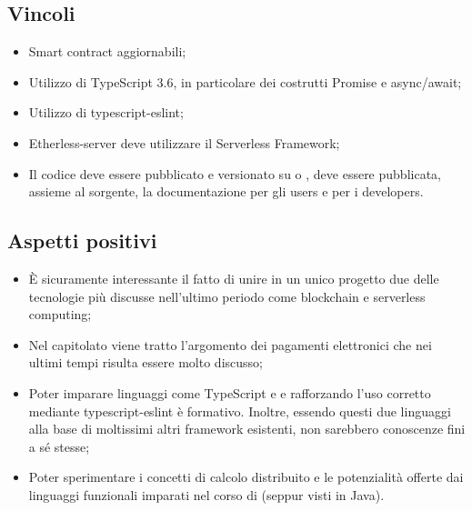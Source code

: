 \subsection{Vincoli}
\begin{itemize}
\item Smart contract aggiornabili;
\item Utilizzo di TypeScript 3.6, in particolare dei costrutti Promise e async/await;
\item Utilizzo di typescript-eslint;
\item Etherless-server deve utilizzare il Serverless Framework;
\item Il codice deve essere pubblicato e versionato su  o , deve essere pubblicata, assieme al sorgente, la documentazione per gli users e per i developers.
\end{itemize}

\subsection{Aspetti positivi}
\begin{itemize}
\item È sicuramente interessante il fatto di unire in un unico progetto due delle tecnologie più discusse nell'ultimo periodo come blockchain e serverless computing;
\item Nel capitolato viene tratto l'argomento dei pagamenti elettronici che nei ultimi tempi risulta essere molto discusso;
\item Poter imparare linguaggi come TypeScript e  e rafforzando l'uso corretto mediante typescript-eslint \`e formativo. Inoltre, essendo questi due linguaggi alla base di moltissimi altri framework esistenti, non sarebbero conoscenze fini a sé stesse;
\item Poter sperimentare i concetti di calcolo distribuito e le potenzialità offerte dai linguaggi funzionali imparati nel corso di  (seppur visti in Java).
\end{itemize}

